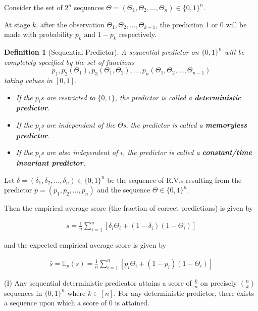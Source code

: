 \documentclass[11pt]{article}
\numberwithin{equation}{section}
\theoremstyle{boldStyle}
\newtheorem{definition}{Definition}[section]
\begin{document}
Consider the set of $2^n$ sequences $\Theta = (\Theta_1, \Theta_2, \ldots, \Theta_{n}) \in \{0, 1\}^n$.

At stage $k$, after the observation $\Theta_1, \Theta_2, \ldots, \Theta_{k-1}$, the prediction 1 or 0 will be made with probability $p_k$ and $1-p_k$ respectively.

\begin{definition}[Sequential Predictor]
    A sequential predictor on $\{0, 1\}^n$ will be completely specified by the set of functions 
    \[
        p_1, p_2(\Theta_1), p_3(\Theta_1, \Theta_2), \ldots, p_n(\Theta_1, \Theta_2, \ldots, \Theta_{n-1})
    \]
    taking values in $[0, 1]$.
    \begin{itemize}
        \item If the $p_i$s are restricted to $\{0, 1\}$, the predictor is called a \textbf{deterministic predictor}.
        \item If the $p_i$s are independent of the $\Theta$s, the predictor is called a \textbf{memoryless predictor}.
        \item If the $p_i$s are also independent of $i$, the predictor is called a \textbf{constant/time invariant predictor}.
    \end{itemize}
\end{definition}

Let $\delta = (\delta_1, \delta_2, \ldots, \delta_n) \in \{0, 1\}^n$ be the sequence of R.V.s resulting from the predictor $p = (p_1, p_2, \ldots, p_n)$ and the sequence $\Theta \in \{0, 1\}^n$.

Then the empirical average score (the fraction of correct predictions) is given by

\begin{align}
    s = \frac{1}{n} \sum_{i=1}^{n} [\delta_i \Theta_i + (1 - \delta_i)(1 - \Theta_i)]
\end{align}

and the expected empirical average score is given by

\begin{align}
    \bar{s} = \mathbb{E}_{p}(s) =  \frac{1}{n} \sum_{i=1}^{n} [p_i \Theta_i + (1 - p_i)(1 - \Theta_i)] 
\end{align}

(I) Any sequential deterministic predicator attains a score of $\frac{k}{n}$ on precisely $\binom{n}{k}$ sequences in $\{0, 1\}^n$ where $k \in [n]$.
For any deterministic predictor, there exists a sequence upon which a score of 0 is attained.
\end{document}
